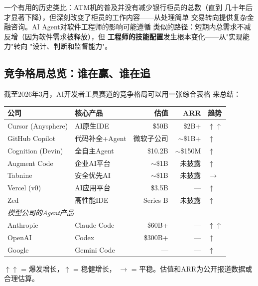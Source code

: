 一个有用的历史类比：ATM机的普及并没有减少银行柜员的总数（直到
几十年后才显著下降），但深刻改变了柜员的工作内容——从处理简单
交易转向提供复杂金融咨询。AI Agent对软件工程师的影响可能遵循
类似的路径：短期内总需求不减反增（因为软件需求被释放），但
\textbf{工程师的技能配置}发生根本变化——从"实现能力"转向
"设计、判断和监督能力"。

\subsection{竞争格局总览：谁在赢、谁在追}
\label{subsec:competitive-overview}

截至2026年3月，AI开发者工具赛道的竞争格局可以用一张综合表格
来总结：

\begin{keybox}[AI 开发者工具赛道竞争全景（2026年3月）]
\small
\begin{tabularx}{\textwidth}{l X r r l}
\toprule
\rowcolor{figLightGray}
\textbf{公司} & \textbf{核心产品} & \textbf{估值}
  & \textbf{ARR} & \textbf{趋势} \\
\midrule
Cursor (Anysphere) & AI原生IDE     & \$50B  & \$2B+  & $\uparrow\uparrow$ \\
GitHub Copilot & 代码补全+Agent  & 微软子公司 & $\sim$\$1B+ & $\uparrow$ \\
Cognition (Devin) & 全自主Agent   & \$10.2B & $\sim$\$150M & $\uparrow$ \\
Augment Code   & 企业AI平台     & $\sim$\$1B & 未披露  & $\uparrow$ \\
Tabnine        & 安全优先AI     & $\sim$\$1B & 未披露  & $\rightarrow$ \\
Vercel (v0)    & AI应用平台     & \$3.5B  & ---     & $\uparrow$ \\
Zed            & 高性能IDE      & Series B & 未披露  & $\uparrow$ \\
\midrule
\multicolumn{5}{l}{\textit{模型公司的Agent产品}} \\
\midrule
Anthropic      & Claude Code    & \$60B+  & ---     & $\uparrow\uparrow$ \\
OpenAI         & Codex          & \$300B+ & ---     & $\uparrow$ \\
Google         & Gemini Code    & ---     & ---     & $\uparrow$ \\
\bottomrule
\end{tabularx}

\medskip
\noindent $\uparrow\uparrow$ = 爆发增长，$\uparrow$ = 稳健增长，
$\rightarrow$ = 平稳。估值和ARR为公开报道数据或合理估算。
\end{keybox}

